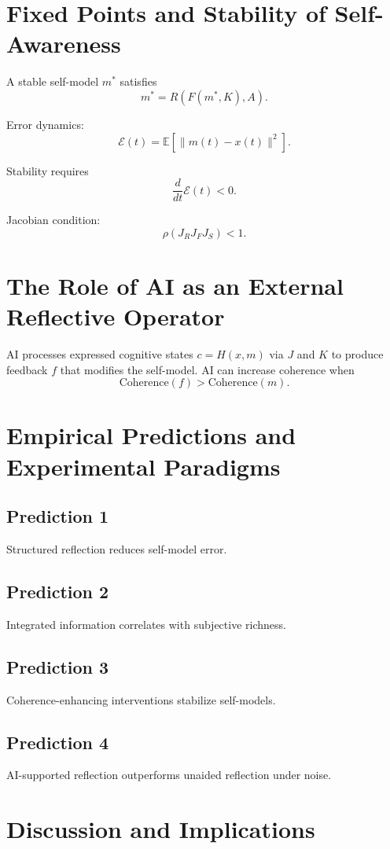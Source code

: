 \documentclass[12pt]{article}
\begin{document}
\section{Fixed Points and Stability of Self-Awareness}

A stable self-model $m^*$ satisfies
\[
m^* = R(F(m^*, K), A).
\]

Error dynamics:
\[
\mathcal{E}(t) = \mathbb{E}[\|m(t) - x(t)\|^2].
\]

Stability requires
\[
\frac{d}{dt}\mathcal{E}(t) < 0.
\]

Jacobian condition:
\[
\rho(J_R J_F J_S) < 1.
\]

\section{The Role of AI as an External Reflective Operator}

AI processes expressed cognitive states $c = H(x,m)$ via $J$ and $K$ to produce feedback $f$ that modifies the self-model. AI can increase coherence when
\[
\text{Coherence}(f) > \text{Coherence}(m).
\]

\section{Empirical Predictions and Experimental Paradigms}

\subsection*{Prediction 1}
Structured reflection reduces self-model error.

\subsection*{Prediction 2}
Integrated information correlates with subjective richness.

\subsection*{Prediction 3}
Coherence-enhancing interventions stabilize self-models.

\subsection*{Prediction 4}
AI-supported reflection outperforms unaided reflection under noise.

\section{Discussion and Implications}
\end{document}
